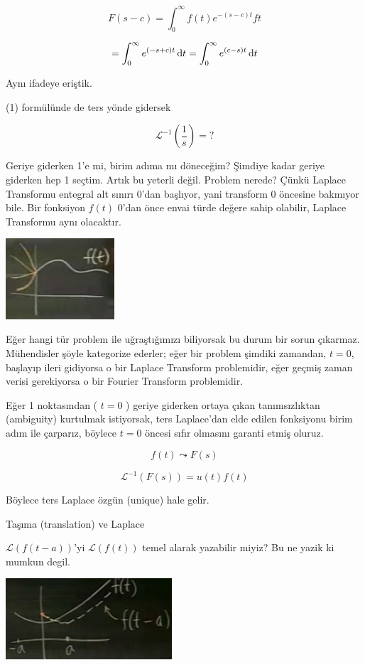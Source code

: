 \documentclass[12pt,fleqn]{article}\usepackage{../../common}
\begin{document}
$$ F(s-c) = \int _{0}^{\infty} f(t) e^{-(s-c)t} ft  $$

$$ = \int _{0}^{\infty} e^{(-s+c)t} \,\mathrm{d} t  = \int _{0}^{\infty} e^{(c-s)t} \,\mathrm{d} t $$

Aynı ifadeye eriştik. 

(1) formülünde de ters yönde gidersek

$$ \mathcal{L}^{-1}(\frac{1}{s}) = ?  $$

Geriye giderken 1'e mi, birim adıma mı döneceğim? Şimdiye kadar geriye
giderken hep 1 seçtim. Artık bu yeterli değil. Problem nerede? Çünkü
Laplace Transformu entegral alt sınırı 0'dan başlıyor, yani transform 0
öncesine bakmıyor bile. Bir fonksiyon $f(t)$ 0'dan önce envai türde değere
sahip olabilir, Laplace Transformu aynı olacaktır. 

\includegraphics[height=3cm]{22_6.png}

Eğer hangi tür problem ile uğraştığımızı biliyorsak bu durum bir sorun
çıkarmaz. Mühendisler şöyle kategorize ederler; eğer bir problem şimdiki
zamandan, $t=0$, başlayıp ileri gidiyorsa o bir Laplace Transform
problemidir, eğer geçmiş zaman verisi gerekiyorsa o bir Fourier Transform
problemidir. 

Eğer 1 noktasından ( $t=0$ ) geriye giderken ortaya çıkan tanımsızlıktan
(ambiguity) kurtulmak istiyorsak, ters Laplace'dan elde edilen fonksiyonu
birim adım ile çarparız, böylece $t=0$ öncesi sıfır olmasını garanti etmiş
oluruz.

$$ f(t) \leadsto F(s) $$

$$ \mathcal{L}^{-1}(F(s)) = u(t)f(t) $$

Böylece ters Laplace özgün (unique) hale gelir.

Taşıma (translation) ve Laplace 

$\mathcal{L}(f(t-a))$'yi $\mathcal{L}(f(t))$ temel alarak yazabilir miyiz?
Bu ne yazik ki mumkun degil. 

\includegraphics[height=3cm]{22_7.png}
\end{document}
